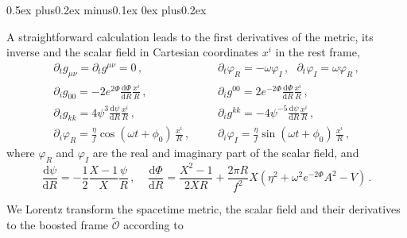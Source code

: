 \documentclass[]{iopart}
\newcommand{\du}{\mathrm{d}}
\newcommand{\us}[1]{\textcolor{teal}{[{\it\textbf{US: #1}}]} }
\renewcommand{\mr}[1]{\textcolor{purple}{[{\it\textbf{MR: #1}}]} }
\begin{document}
\begin{list}{\rm{\bf ()}}{
                
             \parsep0.5ex plus0.2ex minus0.1ex \itemsep0ex plus0.2ex}
  \item A straightforward calculation leads to the first derivatives of the
  metric, its inverse and the scalar field in Cartesian coordinates $x^i$ in the rest frame,
  \begin{eqnarray}
    \partial_t g_{\mu\nu}=\partial_t g^{\mu\nu}=0\,,~~~&&
    \partial_t \varphi_R = -\omega \varphi_I\,,~~~
    \partial_t \varphi_I = \omega \varphi_R\,,
    \nonumber \\[5pt]
    \partial_i g_{00} = -2e^{2\Phi}\frac{\du \Phi}{\du R} \frac{x^i}{R}\,,
    ~~~~~&&
    \partial_i g^{00} = 2e^{-2\Phi} \frac{\du \Phi}{\du R}\frac{x^i}{R}\,,
    \nonumber \\[5pt]
    \partial_i g_{kk} = 4\psi^3 \frac{\du \psi}{\du R} \frac{x^i}{R}\,,
    && \partial_i g^{kk} = -4\psi^{-5} \frac{\du \psi}{\du R}
          \frac{x^i}{R}\,,
    \nonumber \\[5pt]
    \partial_i \varphi_R = \frac{\eta}{f} \cos(\omega t + \phi_0)\,
        \frac{x^i}{R}\,,~~~~&&
  \partial_i \varphi_I = \frac{\eta}{f} \sin(\omega t + \phi_0)\,
        \frac{x^i}{R}\,,
  \end{eqnarray}
  where $\varphi_R$ and $\varphi_I$ are the real and imaginary part of the
  scalar field, and
  \begin{equation}
    \frac{\du \psi}{\du R} = -\frac{1}{2}
        \frac{X-1}{X} \frac{\psi}{R}\,,~~~~~
        \displaystyle \frac{\du \Phi}{\du R}=
        \frac{X^2-1}{2XR}+\frac{2\pi R}{f^2}X(\eta^2+\omega^2
        e^{-2\Phi}A^2-V)\,.
  \end{equation}
  \item We Lorentz transform the spacetime metric, the scalar field and their
  derivatives to the boosted frame $\tilde{\mathcal{O}}$ according to

\end{list}
\end{document}
